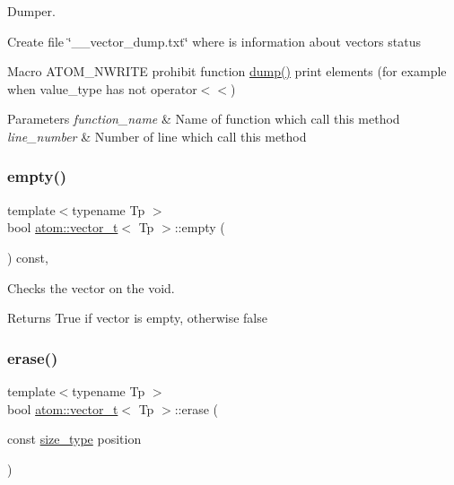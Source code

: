 Dumper. 

Create file \char`\"{}\+\_\+\+\_\+vector\+\_\+dump.\+txt\char`\"{} where is information about vector\textquotesingle{}s status

Macro A\+T\+O\+M\+\_\+\+N\+W\+R\+I\+TE prohibit function \hyperlink{classatom_1_1vector__t_a5dbc4a2fbead76e7bfb2105693bb9680}{dump()} print elements (for example when value\+\_\+type has not operator$<$$<$) 
\begin{DoxyParams}{Parameters}
{\em function\+\_\+name} & Name of function which call this method \\
\hline
{\em line\+\_\+number} & Number of line which call this method \\
\hline
\end{DoxyParams}
\mbox{\label{classatom_1_1vector__t_a0204758afeafe695689a8c926fa79897}} 
\subsubsection{\texorpdfstring{empty()}{empty()}}
{\footnotesize\ttfamily template$<$typename Tp $>$ \\
bool \hyperlink{classatom_1_1vector__t}{atom\+::vector\+\_\+t}$<$ Tp $>$\+::empty (\begin{DoxyParamCaption}{ }\end{DoxyParamCaption}) const\hspace{0.3cm}{\ttfamily [inline]}, {\ttfamily [noexcept]}}



Checks the vector on the void. 

\begin{DoxyReturn}{Returns}
True if vector is empty, otherwise false 
\end{DoxyReturn}
\mbox{\label{classatom_1_1vector__t_ab414b36ee5235f86352dbdb73ff6c0e0}} 
\subsubsection{\texorpdfstring{erase()}{erase()}}
{\footnotesize\ttfamily template$<$typename Tp $>$ \\
bool \hyperlink{classatom_1_1vector__t}{atom\+::vector\+\_\+t}$<$ Tp $>$\+::erase (\begin{DoxyParamCaption}\item[{const \hyperlink{classatom_1_1vector__t_a1790d79321f4fa8d2580474dd0f56033}{size\+\_\+type}}]{position }\end{DoxyParamCaption})\hspace{0.3cm}{\ttfamily [inline]}}



